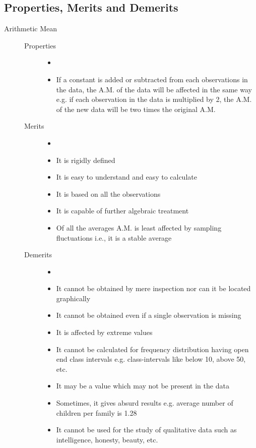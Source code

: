 \documentclass[
10pt, %
a4paper, %
]{report}
\begin{document}
\subsection{Properties, Merits and Demerits}
\begin{description}
\item[Arithmetic Mean]
\begin{description}
\item[]
\item[Properties]
\begin{itemize}
\item[]
\item If a constant is added or subtracted from each observations in the data, the A.M. of the data will be affected in the same way e.g. if each observation in the data is multiplied by 2, the A.M. of the new data will be two times the original A.M.
\end{itemize}
\item[Merits]
\begin{itemize}
\item[]
\item It is rigidly defined
\item It is easy to understand and easy to calculate
\item It is based on all the observations
\item It is capable of further algebraic treatment
\item Of all the averages A.M. is least affected by sampling fluctuations i.e., it is a stable average
\end{itemize}
\item[Demerits]
\begin{itemize}
\item[]
\item It cannot be obtained by mere inspection nor can it be located graphically
\item It cannot be obtained even if a single observation is missing
\item It is affected by extreme values
\item It cannot be calculated for frequency distribution having open end class intervals e.g. class-intervals like below 10, above 50, etc.
\item It may be a value which may not be present in the data
\item Sometimes, it gives absurd results e.g. average number of children per family is 1.28
\item It cannot be used for the study of qualitative data such as intelligence, honesty, beauty, etc.

\end{itemize}
\end{description}
\end{description}
\end{document}
